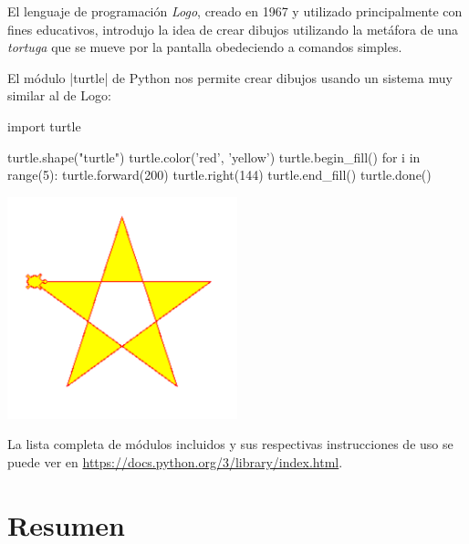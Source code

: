 \begin{sabias_que}
El lenguaje de programación \emph{Logo}, creado en 1967 y utilizado
principalmente con fines educativos, introdujo la idea de crear dibujos
utilizando la metáfora de una \emph{tortuga} que se mueve por la pantalla
obedeciendo a comandos simples.

El módulo |turtle| de Python nos permite crear dibujos usando un sistema muy
similar al de Logo:

\noindent\begin{minipage}{.45\textwidth}
\begin{codigo-python-sn}
import turtle

turtle.shape("turtle")
turtle.color('red', 'yellow')
turtle.begin_fill()
for i in range(5):
    turtle.forward(200)
    turtle.right(144)
turtle.end_fill()
turtle.done()
\end{codigo-python-sn}
\end{minipage}\hfill%
\begin{minipage}{.45\textwidth}
\centerline{\includegraphics[width=0.5\textwidth]{graficos/turtle}}
\end{minipage}
\end{sabias_que}

La lista completa de módulos incluidos y sus respectivas instrucciones de uso
se puede ver en
\url{https://docs.python.org/3/library/index.html}.

\section{Resumen}

